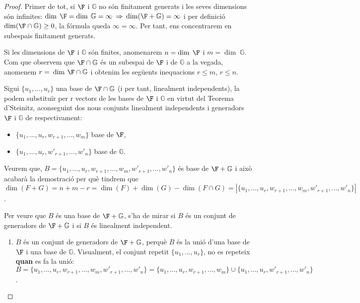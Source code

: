 \begin{proof}
Primer de tot, si $\F$ i $\mathbb{G}$ no són finitament generats i les seves dimensions són infinites: $\dim\;\F = \dim\;\mathbb{G} = \infty \: \Rightarrow \: \dim(\F+\mathbb{G}) = \infty$ i per definició $\dim(\F\cap\mathbb{G}) \geq 0$, la fórmula queda $\infty = \infty$. Per tant, ens concentrarem en subespais finitament generats.


Si les dimensions de $\F$ i $\mathbb{G}$ són finites, anomenarem $n = \dim\;\F$ i $m = \dim\;\mathbb{G}$. Com que observem que $\F\cap\mathbb{G}$ és un subespai de $\F$ i de $\mathbb{G}$ a la vegada, anomenem $r = \:\dim\:\F\cap\mathbb{G}$ i obtenim les següents inequacions $r \leq m$, $r \leq n$.


Sigui $\{u_1,...,u_r\}$ una base de $\F\cap\mathbb{G}$ (i per tant, linealment independents), la podem substituïr per r vectors de les bases de $\F$ i $\mathbb{G}$ en virtut del Teorema d'Steinitz, aconseguint dos nous conjunts linealment independents i generadors $\F$ i $\mathbb{G}$ de respectivament:
\begin{itemize}
    \item $\{u_1,...,u_r, w_{r+1}, ..., w_m\}$ base de $\F$,
    \item $\{u_1,...,u_r,w'_{r+1},...,w'_n\}$ base de $\mathbb{G}$.
\end{itemize}    
Veurem que, $B = \{u_1,...,u_r, w_{r+1}, ..., w_m, w'_{r+1},...,w'_n\}$ és base de $\F+\mathbb{G}$ i això acabarà la demostració per què tindrem que $\dim(F + G) = n +m- r = \dim(F) + \dim(G) - \dim(F \cap G) = |\{u_1,...,u_r, w_{r+1}, ..., w_m, w'_{r+1},...,w'_n\}|$.


Per veure que $B$ és una base de $\F+\mathbb{G}$, s'ha de mirar si $B$ és un conjunt de generadors de $\F+\mathbb{G}$ i si $B$ és linealment independent.

\begin{enumerate}[(1)]
\item $B$ és un conjunt de generadors de $\F+\mathbb{G}$, perquè $B$ és la unió d'una base de $\F$ i una base de $\mathbb{G}$. Visualment, el conjunt repetit $\{u_1,...,u_r\}$, no es repeteix \textbf{quan} es fa la unió: $B = \{u_1,...,u_r, w_{r+1}, ..., w_m, w'_{r+1},...,w'_n\} = \{u_1,...,u_r, w_{r+1}, ..., w_m\}\cup\{u_1,...,u_r,w'_{r+1},...,w'_n\}$.


\end{enumerate}
\end{proof}

